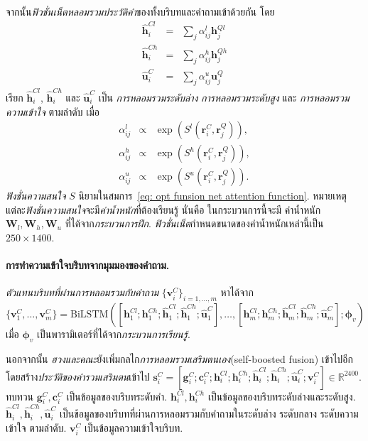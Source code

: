 จากนั้น\textit{ฟิวชั่นเน็ตหลอมรวม}\textit{ประวัติคำ}ของทั้งบริบทและคำถามเข้าด้วยกัน 
โดย
%
\begin{eqnarray}
\bm{\hat{h}}^{Cl}_i &=& \sum_j \alpha^l_{ij} \bm{h}^{Ql}_j
\label{eq: opt fusion net fusion l}
\\
\bm{\hat{h}}^{Ch}_i &=& \sum_j \alpha^h_{ij} \bm{h}^{Qh}_j
\label{eq: opt fusion net fusion h}
\\
\bm{\hat{u}}^C_i &=& \sum_j \alpha^u_{ij} \bm{u}^Q_j
\label{eq: opt fusion net fusion ul}
\end{eqnarray}
เรียก
$\bm{\hat{h}}^{Cl}_i$,
$\bm{\hat{h}}^{Ch}_i$
และ $\bm{\hat{u}}^C_i$
เป็น \textit{การหลอมรวมระดับล่าง}
\textit{การหลอมรวมระดับสูง}
และ
\textit{การหลอมรวมความเข้าใจ}
ตามลำดับ
เมื่อ
%
\begin{eqnarray}
\alpha^l_{ij} & \propto & \exp (S^l(\bm{r}^C_i, \bm{r}^Q_j))
\label{eq: opt funsion net alpha la},
\\
\alpha^h_{ij} & \propto & \exp(S^h(\bm{r}^C_i, \bm{r}^Q_j))
\label{eq: opt funsion net alpha lb},
\\
\alpha^u_{ij} & \propto & \exp(S^u(\bm{r}^C_i, \bm{r}^Q_j))
\label{eq: opt funsion net alpha lc}.
\end{eqnarray}
\textit{ฟังชั่นความสนใจ} $S$ นิยามในสมการ~\ref{eq: opt funsion net attention function}.
หมายเหตุ แต่ละ\textit{ฟังชั่นความสนใจ}จะมี\textit{ค่าน้ำหนัก}ที่ต้องเรียนรู้
นั่นคือ ในกระบวนการนี้จะมี
ค่าน้ำหนัก $\bm{W}_l, \bm{W}_h, \bm{W}_u$ ที่ได้จาก\textit{กระบวนการฝึก}.
\textit{ฟิวชั่นเน็ต}กำหนดขนาดของค่าน้ำหนักเหล่านี้เป็น $250 \times 1400$.

\paragraph{การทำความเข้าใจบริบทจากมุมมองของคำถาม.}
\textit{ตัวแทนบริบทที่ผ่านการหลอมรวมกับคำถาม} $\{\bm{v}^C_i\}_{i=1,\ldots,m}$ หาได้จาก
%
\begin{equation}
\{\bm{v}^C_1, \ldots, \bm{v}^C_m \}
=
\mathrm{BiLSTM}(
[\bm{h}_1^{Cl}; \bm{h}_1^{Ch};
\bm{\hat{h}}_1^{Cl}; \bm{\hat{h}}_1^{Ch};
\bm{\hat{u}}_1^C],
\ldots,
[\bm{h}_m^{Cl}; \bm{h}_m^{Ch};
\bm{\hat{h}}_m^{Cl}; \bm{\hat{h}}_m^{Ch};
\bm{\hat{u}}_m^C];
\bm{\phi}_v
)
\label{eq: opt fusion net v}
\end{equation}
เมื่อ $\bm{\phi}_v$ เป็นพารามิเตอร์ที่ได้จาก\textit{กระบวนการเรียนรู้}.

นอกจากนั้น  \textit{ฮวงและคณะ}ยังเพิ่มกลไก\textit{การหลอมรวมเสริมตนเอง}(self-boosted fusion) เข้าไปอีก โดยสร้าง\textit{ประวัติของคำรวมเสริมตน}เข้าไป
$\bm{s}^C_i = [\bm{g}^C_i; \bm{c}^C_i;
\bm{h}^{Cl}_i; \bm{h}^{Ch}_i;
\bm{\hat{h}}^{Cl}_i; \bm{\hat{h}}^{Ch}_i;
\bm{\hat{u}}^C_i; \bm{v}^C_i
] \in \mathbb{R}^{2400}$.
ทบทวน $\bm{g}^C_i, \bm{c}^C_i$ เป็นข้อมูลของบริบทระดับคำ.
$\bm{h}^{Cl}_i, \bm{h}^{Ch}_i$
เป็นข้อมูลของบริบทระดับล่างและระดับสูง.
$\bm{\hat{h}}^{Cl}_i, \bm{\hat{h}}^{Ch}_i,
\bm{\hat{u}}^C_i$
เป็นข้อมูลของบริบทที่ผ่านการหลอมรวมกับคำถามในระดับล่าง ระดับกลาง ระดับความเข้าใจ ตามลำดับ.
$\bm{v}^C_i$ เป็นข้อมูลความเข้าใจบริบท.

